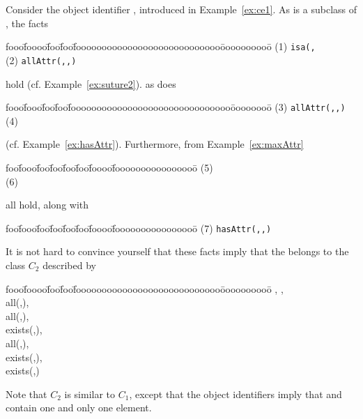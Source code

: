 \begin{example} \rm \label{ex:type1cc}
Consider the object identifier {\tt {}}, introduced in
Example~\ref{ex:ce1}.  As {\tt {}} is a subclass of
{\tt {}}, the facts
{\small
\begin{tabbing}
fooo\=foooo\=foo\=foo\=foooooooooooooooooooooooooooo\=oooooooooo\=\kill
\> (1) \> {\tt isa(,} \\
\> (2) \> {\tt allAttr(,,)} 
\end{tabbing}
}
\noindent
hold (cf. Example~\ref{ex:suture2}).  as does
{\small
\begin{tabbing}
fooo\=fooo\=foo\=foo\=fooooooooooooooooooooooooooooooo\=oooooooo\=\kill
\> (3) \> {\tt allAttr(,,) } \\
\> (4) 
\end{tabbing}
}
\noindent
(cf. Example~\ref{ex:hasAttr}).  Furthermore, from Example~\ref{ex:maxAttr}
{\small
\begin{tabbing}
foo\=fooo\=foo\=foo\=foo\=foo\=foooo\=foooooooooooooooo\=\kill
\> (5)  \\
\> (6)  
\end{tabbing}
}
\noindent
all hold, along with 
{\small
\begin{tabbing}
foo\=fooo\=foo\=foo\=foo\=foo\=foooo\=foooooooooooooooo\=\kill
\> (7) \> {\tt hasAttr(,,) }
\end{tabbing}
} 
\noindent
It is not hard to convince yourself that these facts imply that the
{\tt {}} belongs to the class $C_2$ described by
{\em {\small
\begin{tabbing}
fooo\=foooo\=foo\=foo\=foooooooooooooooooooooooooooo\=oooooooooo\=\kill
\> , , \\
\> all(,),  \\
\> all(,), \\
	exists(,), \\
\> all(,),  \\
\> \> 	exists(,),  \\
\> \> 	exists(,)
\end{tabbing}
} }
\noindent
Note that $C_2$ is similar to $C_1$, except that the object
identifiers imply that {\tt {}} and {\tt
{}} contain one and only one element.
\end{example}


